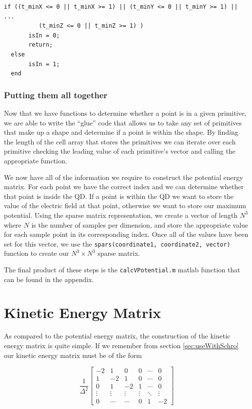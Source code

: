\documentclass[authoryearcitations]{UoYCSproject}
\begin{document}
\begin{lstlisting}[caption={Boolean expression for points in a RecPrism}, label=lst:boolExpr, firstnumber=19]
  if ((t_minX <= 0 || t_minX >= 1) || (t_minY <= 0 || t_minY >= 1) || ...
          (t_minZ <= 0 || t_minZ >= 1) )
       isIn = 0;
       return;
  else
       isIn = 1;
  end
\end{lstlisting} 

\subsubsection{Putting them all together}

Now that we have functions to determine whether a point is in a given primitive, we are able to write the ``glue''
code that allows us to take any set of primitives that make up a shape and determine if a point is within
the shape. By finding the length of the cell array that stores the primitives we can iterate over each primitive
checking the leading value of each primitive's vector and calling the appropriate function. 

We now have all of the information we require to construct the potential energy matrix. For each point we have
the correct index and we can determine whether that point is inside the QD. If a point is within the QD we 
want to store the value of the electric field at that point, otherwise we want to store our maximum potential. 
Using the sparse matrix representation, we create a vector of length $N^3$ where $N$ is the number of samples per
dimension, and
store the appropriate value for each sample point in its corresponding index. Once all of the values have been set
for this vector, we use the \verb+spars(coordinate1, coordinate2, vector)+ function to create our $N^3 \times N^3$
sparse matrix.

The final product of these steps is the \verb+calcVPotential.m+ matlab function that can be found in the appendix. 

\section{Kinetic Energy Matrix}
As compared to the potential energy matrix, the construction of the kinetic energy matrix is quite simple. 
If we remember from section \ref{sec:useWithSchro} our kinetic energy matrix must be of the form

\begin{equation}
\frac{1}{\Delta ^2}\begin{bmatrix}
                -2     &   1    &     0    &     0   & \cdots & 0 \\
                1      &  -2    &     1    &     0   & \cdots & 0 \\
                0      &   1    &    -2    &     1   & \cdots & 0 \\
                \vdots & \vdots &   \vdots & \vdots  & \ddots & \vdots \\
                0      & \cdots &    \cdots     &     0   &    1   & -2
              \end{bmatrix}
\label{eq:kinetic2}
\end{equation}
\end{document}
